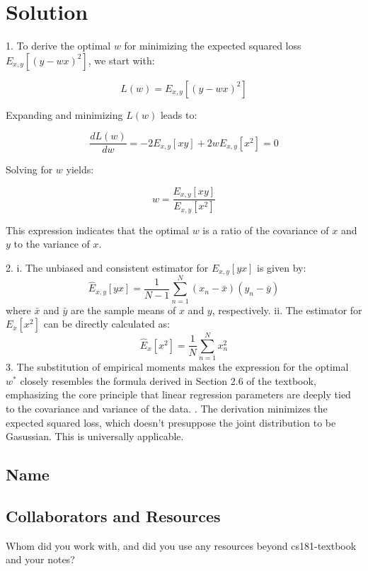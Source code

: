 \documentclass[submit]{harvardml}
\newenvironment{solution}
  {\color{blue}\section*{Solution}}
{}
\begin{document}
\begin{solution}
1. To derive the optimal \(w\) for minimizing the expected squared loss \(E_{x,y}[(y - wx)^2]\), we start with:

\[L(w) = E_{x,y}[(y - wx)^2]\]

Expanding and minimizing \(L(w)\) leads to:

\[\frac{dL(w)}{dw} = -2E_{x,y}[xy] + 2wE_{x,y}[x^2] = 0\]

Solving for \(w\) yields:

\[w = \frac{E_{x,y}[xy]}{E_{x,y}[x^2]}\]

This expression indicates that the optimal \(w\) is a ratio of the covariance of \(x\) and \(y\) to the variance of \(x\).

2. i. The unbiased and consistent estimator for \(E_{x,y}[yx]\) is given by:
\[
\hat{E}_{x,y}[yx] = \frac{1}{N-1} \sum_{n=1}^N (x_n - \bar{x})(y_n - \bar{y})
\]
where \(\bar{x}\) and \(\bar{y}\) are the sample means of \(x\) and \(y\), respectively.
\newline ii. The estimator for \(E_{x}[x^2]\) can be directly calculated as:
\[
\hat{E}_{x}[x^2] = \frac{1}{N} \sum_{n=1}^N x_n^2
\]
3. The substitution of empirical moments makes the expression for the optimal \(w^*\) closely resembles the formula derived in Section 2.6 of the textbook, emphasizing the core principle that linear regression parameters are deeply tied to the covariance and variance of the data. . The derivation minimizes the expected squared loss, which doesn't presuppose the joint distribution to be Gasussian. This is universally applicable. 



\end{solution}

\newpage
\subsection*{Name}

\subsection*{Collaborators and Resources}
Whom did you work with, and did you use any resources beyond cs181-textbook and your notes?
\end{document}

